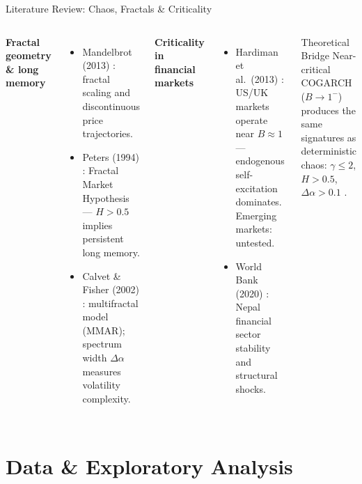 \documentclass[10pt, aspectratio=169]{beamer}
\begin{document}
\begin{frame}{Literature Review: Chaos, Fractals \& Criticality}
\begin{columns}[T]
  \textbf{Fractal geometry \& long memory}
  \begin{itemize}\small
    \item Mandelbrot (2013) \cite{mandelbrot2013fractals}: fractal
          scaling and discontinuous price trajectories.
    \item Peters (1994) \cite{peters1994fractal}: Fractal Market
          Hypothesis — $H>0.5$ implies persistent long memory.
    \item Calvet \& Fisher (2002) \cite{calvet2002multifractality}:
          multifractal model (MMAR); spectrum width $\Delta\alpha$
          measures volatility complexity.
  \end{itemize}
  \textbf{Criticality in financial markets}
  \begin{itemize}\small
    \item Hardiman et al.\ (2013) \cite{hardiman2013critical}:
          US/UK markets operate near $B\approx 1$ — endogenous
          self-excitation dominates. Emerging markets: untested.
    \item World Bank (2020) \cite{worldbank2020nepal}: Nepal
          financial sector stability and structural shocks.
  \end{itemize}
  \vspace{0.15cm}
  \begin{alertblock}{Theoretical Bridge}
    Near-critical COGARCH ($B\to 1^-$) produces the same
    signatures as deterministic chaos: $\gamma\le 2$, $H>0.5$,
    $\Delta\alpha>0.1$
    \cite{kluppelberg2004continuous,hardiman2013critical}.
  \end{alertblock}
\end{columns}
\end{frame}


\section{Data \& Exploratory Analysis}
\end{document}
